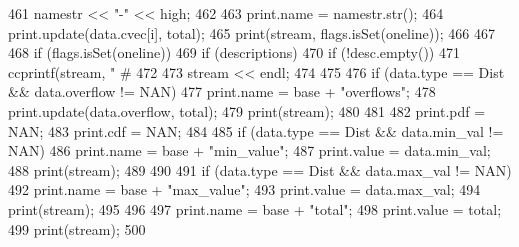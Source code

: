 \begin{DoxyCode}
{{461             namestr << "-" << high;
462 
463         print.name = namestr.str();
464         print.update(data.cvec[i], total);
465         print(stream, flags.isSet(oneline));
466     }
467 
468     if (flags.isSet(oneline)) {
469         if (descriptions) {
470             if (!desc.empty())
471                 ccprintf(stream, " # %
472         }
473         stream << endl;
474     }
475 
476     if (data.type == Dist && data.overflow != NAN) {
477         print.name = base + "overflows";
478         print.update(data.overflow, total);
479         print(stream);
480     }
481 
482     print.pdf = NAN;
483     print.cdf = NAN;
484 
485     if (data.type == Dist && data.min_val != NAN) {
486         print.name = base + "min_value";
487         print.value = data.min_val;
488         print(stream);
489     }
490 
491     if (data.type == Dist && data.max_val != NAN) {
492         print.name = base + "max_value";
493         print.value = data.max_val;
494         print(stream);
495     }
496 
497     print.name = base + "total";
498     print.value = total;
499     print(stream);
500 }
\end{DoxyCode}


